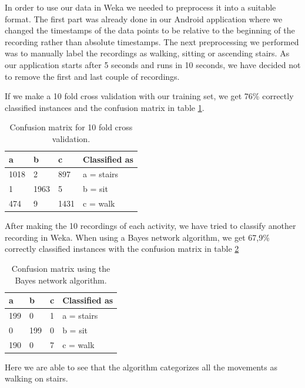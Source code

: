 \documentclass{ubicomp2012}
\begin{document}
In order to use our data in Weka we needed to preprocess it into a suitable format. The first part was already done in our Android application where we changed the timestamps of the data points to be relative to the beginning of the recording rather than absolute timestamps. The next preprocessing we performed was to manually label the recordings as walking, sitting or ascending stairs. As our application starts after 5 seconds and runs in 10 seconds, we have decided not to remove the first and last couple of recordings.

If we make a 10 fold cross validation with our training set, we get 76\% correctly classified instances and the confusion matrix in table \ref{secondConfusionMatrix}.

\begin{table}[!h]
\centering
\def\arraystretch{2}
\begin{tabular}{p{1cm}p{1cm}p{1cm}l}
\toprule
\textbf{a} & \textbf{b} & \textbf{c} & \textbf{Classified as} \\
\midrule
1018 & 2 & 897 & a = stairs \\
1 & 1963 & 5 & b = sit \\
474 & 9 & 1431 & c = walk \\
\bottomrule
\end{tabular}
\caption{Confusion matrix for 10 fold cross validation.}
\label{secondConfusionMatrix}
\end{table}

After making the 10 recordings of each activity, we have tried to classify another recording in Weka. When using a Bayes network algorithm, we get 67,9\% correctly classified instances with the confusion matrix in table \ref{firstConfusionMatrix}

\begin{table}[!h]
\centering
\def\arraystretch{2}
\begin{tabular}{p{1cm}p{1cm}p{1cm}l}
\toprule
\textbf{a} & \textbf{b} & \textbf{c} & \textbf{Classified as} \\
\midrule
199 & 0 & 1 & a = stairs \\
0 & 199 & 0 & b = sit \\
190 & 0 & 7 & c = walk \\
\bottomrule
\end{tabular}
\caption{Confusion matrix using the Bayes network algorithm.}
\label{firstConfusionMatrix}
\end{table}

Here we are able to see that the algorithm categorizes all the movements as walking on stairs.
\newline
\newline
\end{document}
